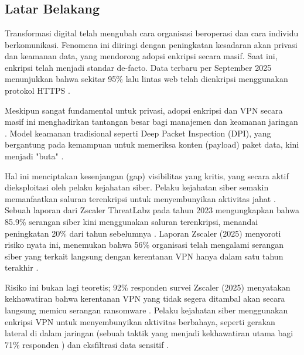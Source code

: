 \chapter{\babSatu}

\section{Latar Belakang}
\label{sec:latar_belakang}
Transformasi digital telah mengubah cara organisasi beroperasi dan cara individu berkomunikasi. Fenomena ini diiringi dengan peningkatan kesadaran akan privasi dan keamanan data, yang mendorong adopsi enkripsi secara masif. Saat ini, enkripsi telah menjadi standar de-facto. Data terbaru per September 2025 menunjukkan bahwa sekitar 95\% lalu lintas web telah dienkripsi menggunakan protokol HTTPS \citep{googleGoogleTransparency}.

Meskipun sangat fundamental untuk privasi, adopsi enkripsi dan VPN secara masif ini menghadirkan tantangan besar bagi manajemen dan keamanan jaringan \citep{wright2004hmm}. Model keamanan tradisional seperti Deep Packet Inspection (DPI), yang bergantung pada kemampuan untuk memeriksa konten (payload) paket data, kini menjadi "buta" \citep{shapira2021flowpic, anderson2018deciphering}.

Hal ini menciptakan kesenjangan (gap) visibilitas yang kritis, yang secara aktif dieksploitasi oleh pelaku kejahatan siber. Pelaku kejahatan siber semakin memanfaatkan saluran terenkripsi untuk menyembunyikan aktivitas jahat \citep{wright2004hmm}. Sebuah laporan dari Zscaler ThreatLabz pada tahun 2023 mengungkapkan bahwa 85.9\% serangan siber kini menggunakan saluran terenkripsi, menandai peningkatan 20\% dari tahun sebelumnya \citep{zscalerThreatLabz2023}. Laporan Zscaler (2025) menyoroti risiko nyata ini, menemukan bahwa 56\% organisasi telah mengalami serangan siber yang terkait langsung dengan kerentanan VPN hanya dalam satu tahun terakhir \citep{zscalerZscalerThreatLabz}.

Risiko ini bukan lagi teoretis; 92\% responden survei Zscaler (2025) menyatakan kekhawatiran bahwa kerentanan VPN yang tidak segera ditambal akan secara langsung memicu serangan ransomware \citep{zscalerZscalerThreatLabz}. Pelaku kejahatan siber menggunakan enkripsi VPN untuk menyembunyikan aktivitas berbahaya, seperti gerakan lateral di dalam jaringan (sebuah taktik yang menjadi kekhawatiran utama bagi 71\% responden \citep{zscalerZscalerThreatLabz}) dan eksfiltrasi data sensitif \citep{zscalerZscalerThreatLabz}.

